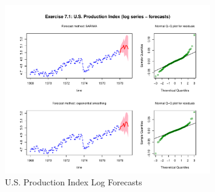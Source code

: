 \begin{figure}[H]
\centering
\includegraphics[width=0.8\textwidth]{plots/UsProdLogForecast.pdf}
\caption{U.S. Production Index Log Forecasts}
\end{figure}